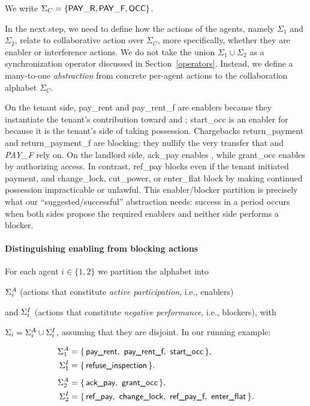 We write \(\Sigma_C=\{\mathsf{PAY\_R},\mathsf{PAY\_F},\mathsf{OCC}\}\).



In the next step, we need to define how the actions of the agents, namely $\Sigma_1$ and $\Sigma_2$, relate to collaborative action over $\Sigma_C$, more specifically, whether they are enabler or interference actions. We do not take the union \(\Sigma_1\cup\Sigma_2\) as a synchronization operator discussed in Section~\ref{operators}. Instead, we define a many-to-one \emph{abstraction} from concrete per-agent actions to the collaboration alphabet \(\Sigma_C\).

On the tenant side, \textsf{pay\_rent} and \textsf{pay\_rent\_f} are enablers because they instantiate the tenant’s contribution toward \PAY and \PAYF; \textsf{start\_occ} is an enabler for \OCC because it is the tenant’s side of taking possession. Chargebacks \textsf{return\_payment} and \textsf{return\_payment\_f} are blocking: they nullify the very transfer that \PAY and \emph{PAY\_F} rely on. On the landlord side, \textsf{ack\_pay} enables \PAY, while \textsf{grant\_occ} enables \OCC by authorizing access. In contrast, \textsf{ref\_pay} blocks \PAY even if the tenant initiated payment, and \textsf{change\_lock}, \textsf{cut\_power}, or \textsf{enter\_flat} block \OCC by making continued possession impracticable or unlawful. This enabler/blocker partition is precisely what our “suggested/successful” abstraction needs: success in a period occurs when both sides propose the required enablers and neither side performs a blocker.





\paragraph{Distinguishing enabling from blocking actions} For each agent \(i\in\{1,2\}\) we partition the alphabet into

\(\Sigma^{A}_{i}\) (actions that constitute \emph{active participation}, i.e., enablers)

and \(\Sigma^{I}_{i}\) (actions that constitute \emph{negative performance}, i.e., blockers), with

\(\Sigma_{i}=\Sigma^{A}_{i}\cup\Sigma^{I}_{i}\), assuming that they are disjoint. In our running example:

\[
\begin{aligned}
\SigA{1} &= \{\,\textsf{pay\_rent},\ \textsf{pay\_rent\_f},\ \textsf{start\_occ}\,\},\\
\SigI{1} &= \{\,\textsf{refuse\_inspection}\,\}.\\[4pt]
\SigA{2} &= \{\,\textsf{ack\_pay},\ \textsf{grant\_occ}\,\},\\
\SigI{2} &= \{\,\textsf{ref\_pay},\ \textsf{change\_lock},\ \textsf{ref\_pay\_f} ,\ \textsf{enter\_flat}\,\}.
\end{aligned}
\]


